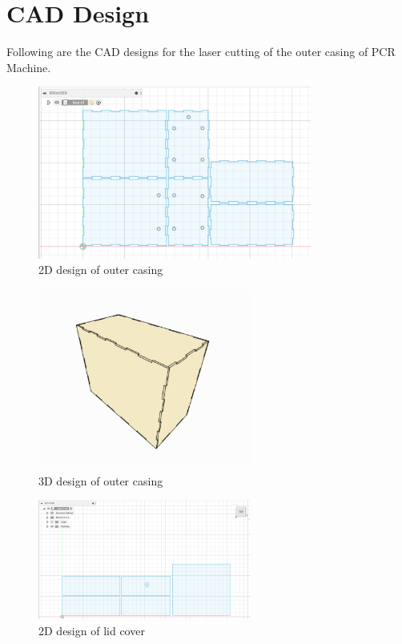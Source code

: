 \documentclass{article}
\begin{document}
\pagebreak

\section{CAD Design}
Following are the CAD designs for the laser cutting of the outer casing of PCR Machine.
\begin{figure}[h]
    \centering
    \includegraphics[width=9cm]{casing 2d.jpeg}
    \caption{2D design of outer casing}
    \label{fig:galaxy}
\end{figure}

\begin{figure}[h]
    \centering
    \includegraphics[width=7cm]{casing 3d.jpeg}
    \caption{3D design of outer casing}
    \label{fig:galaxy}
\end{figure}

\begin{figure}[h]
    \centering
    \includegraphics[width=7cm]{lid 2d.jpeg}
    \caption{2D design of lid cover}
    \label{fig:galaxy}
\end{figure}
\end{document}
